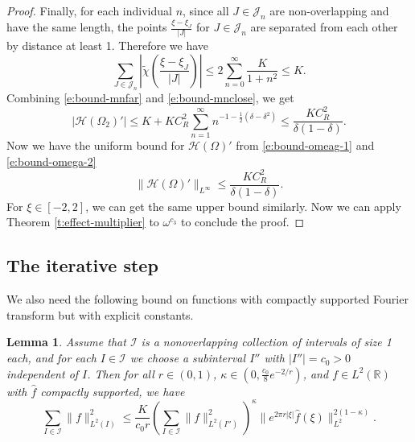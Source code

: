 \documentclass[reqno,12pt,letterpaper]{amsart}
\newtheorem{lem}[prop]{Lemma}
\numberwithin{equation}{section}
\numberwithin{prop}{section}
\begin{document}
\begin{proof}
Finally, for each individual $n$, since all $J\in\mathcal{J}_n$ are non-overlapping and have the same length, the points $\frac{\xi-\xi_J}{|J|}$ for $J\in\mathcal{J}_n$ are separated from each other by distance at least 1. Therefore
we have
\begin{equation}
\label{e:bound-mnclose}
\sum_{J\in\mathcal{J}_n}\left|\widetilde{\chi}\left(\frac{\xi-\xi_J}{|J|}\right)\right|\leq2\sum_{n=0}^\infty\frac{K}{1+n^2}\leq K.
\end{equation}
Combining \eqref{e:bound-mnfar} and \eqref{e:bound-mnclose}, we get
\begin{equation}
\label{e:bound-omega-2}
|\mathcal{H}(\Omega_2)'|\leq K+KC_R^2\sum_{n=1}^\infty n^{-1-\frac{1}{2}(\delta-\delta^2)}\leq\frac{KC_R^2}{\delta(1-\delta)}.
\end{equation}
Now we have the uniform bound for $\mathcal{H}(\Omega)'$ from \eqref{e:bound-omeag-1} and \eqref{e:bound-omega-2}
\begin{equation*}
\|\mathcal{H}(\Omega)'\|_{L^\infty}\leq \frac{KC_R^2}{\delta(1-\delta)}.
\end{equation*}
For $\xi\in[-2,2]$, we can get the same upper bound similarly. Now we can apply Theorem \ref{t:effect-multiplier} to $\omega^{c_3}$ to conclude the proof.
\end{proof}



\subsection{The iterative step}

We also need the following bound on functions with compactly supported Fourier transform \cite[Lemma 3.2]{fullgap} but with explicit constants. 


\begin{lem}
\label{p:boundcompact}
Assume that $\mathcal{I}$ is a nonoverlapping collection of intervals of size 1 each, and for each $I\in\mathcal{I}$ we choose a subinterval $I''$ with $|I''|=c_0>0$ independent of $I$. Then for all $r\in(0,1)$, $\kappa\in(0, \frac{c_0}{8}e^{-2/r})$, and $f\in L^2(\mathbb{R})$ with $\widehat{f}$ compactly supported, we have
\begin{equation}
\label{e:boundcompact}
\sum_{I\in\mathcal{I}}\|f\|_{L^2(I)}^2
\leq \frac{K}{c_0r}\left(\sum_{I\in\mathcal{I}}\|f\|_{L^2(I'')}^2\right)^\kappa\|e^{2\pi r|\xi|}\widehat{f}(\xi)\|_{L^2}^{2(1-\kappa)}.
\end{equation}
\end{lem}
\end{document}
